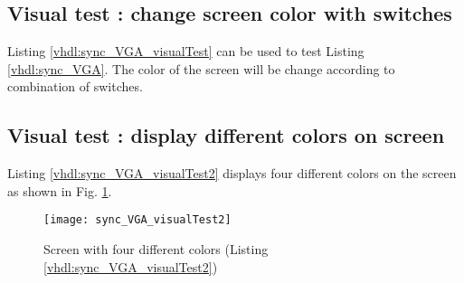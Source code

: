 \subsection{Visual test : change screen color with switches}
Listing \ref{vhdl:sync_VGA_visualTest} can be used to test Listing \ref{vhdl:sync_VGA}. The color of the screen will be change according to combination of switches. 



\subsection{Visual test : display different colors on screen}
Listing \ref{vhdl:sync_VGA_visualTest2} displays four different colors on the screen as shown in Fig. \ref{fig:sync_VGA_visualTest2}. 

\begin{figure}[!h]
	\centering
	\texttt{[image: sync\_VGA\_visualTest2]}
	\caption{Screen with four different colors (Listing \ref{vhdl:sync_VGA_visualTest2})}
	\label{fig:sync_VGA_visualTest2}
\end{figure}


